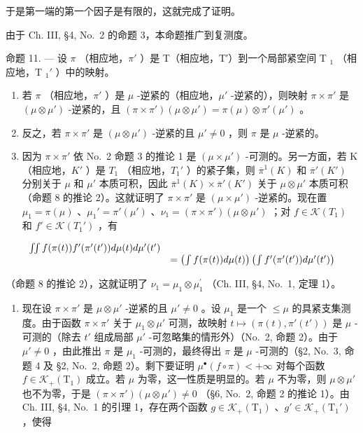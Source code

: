 于是第一端的第一个因子是有限的，这就完成了证明。

由于 Ch. III, §4, No.~2 的命题 3，本命题推广到复测度。

命题 11. --- 设 \(\pi\) （相应地，\(\pi'\) ）是 T（相应地，T′）到一个局部紧空间 T \(_1\) （相应地，T \(_1'\) ）中的映射。

\begin{enumerate}
\def\labelenumi{\alph{enumi})}
\item
  若 \(\pi\) （相应地，\(\pi'\) ）是 \(\mu\) -逆紧的（相应地，\(\mu'\) -逆紧的），则映射 \(\pi \times \pi'\) 是 \((\mu \otimes \mu')\) -逆紧的，且 \((\pi \times \pi')(\mu \otimes \mu') = \pi(\mu) \otimes \pi'(\mu')\) 。
\item
  反之，若 \(\pi \times \pi'\) 是 \((\mu \otimes \mu')\) -逆紧的且 \(\mu' \neq 0\) ，则 \(\pi\) 是 \(\mu\) -逆紧的。
\item
  因为 \(\pi \times \pi'\) 依 No.~2 命题 3 的推论 1 是 \((\mu \times \mu')\) -可测的。另一方面，若 K（相应地，\(K'\) ）是 \(T_1\) （相应地，\(T_1'\) ）的紧子集，则 \(\overline{\pi}^1(K)\) 和 \(\overline{\pi}'(K')\) 分别关于 \(\mu\) 和 \(\mu'\) 本质可积，因此 \(\overline{\pi}^1(K) \times \overline{\pi}'(K')\) 关于 \(\mu \otimes \mu'\) 本质可积（命题 8 的推论 2）。这就证明了 \(\pi \times \pi'\) 是 \((\mu \times \mu')\) -逆紧的。现在置 \(\mu_1 = \pi(\mu)\) 、\(\mu_1' = \pi'(\mu')\) 、\(\nu_1 = (\pi \times \pi')(\mu \otimes \mu')\) ；对 \(f \in \mathcal{K}(T_1)\) 和 \(f' \in \mathcal{K}(T_1')\) ，有
\end{enumerate}

\[
\begin{array}{r l} \iint f (\pi (t)) f ^ {\prime} (\pi^ {\prime} (t ^ {\prime})) d \mu (t) d \mu^ {\prime} (t ^ {\prime}) \\ & = \left(\int f (\pi (t)) d \mu (t)\right) \left(\int f ^ {\prime} (\pi^ {\prime} (t ^ {\prime})) d \mu^ {\prime} (t ^ {\prime})\right) \end{array}
\]

（命题 8 的推论 2），这就证明了 \(\nu_{1} = \mu_{1}\otimes \mu_{1}^{\prime}\) （Ch. III, §4, No.~1, 定理 1）。

\begin{enumerate}
\def\labelenumi{\alph{enumi})}
\setcounter{enumi}{1}
\tightlist
\item
  现在设 \(\pi \times \pi'\) 是 \(\mu \otimes \mu'\) -逆紧的且 \(\mu' \neq 0\) 。设 \(\mu_1\) 是一个 \(\leqslant \mu\) 的具紧支集测度。由于函数 \(\pi \times \pi'\) 关于 \(\mu_1 \otimes \mu'\) 可测，故映射 \(t \mapsto (\pi(t), \pi'(t'))\) 是 \(\mu\) -可测的（除去 \(t'\) 组成局部 \(\mu'\) -可忽略集的情形外）（No.~2, 命题 2）。由于 \(\mu' \neq 0\) ，由此推出 \(\pi\) 是 \(\mu_1\) -可测的，最终得出 \(\pi\) 是 \(\mu\) -可测的（§2, No.~3, 命题 4 及 §2, No.~2, 命题 2）。剩下要证明 \(\mu^{\bullet}(f \circ \pi) < +\infty\) 对每个函数 \(f \in \mathcal{K}_{+}(\mathrm{T}_{1})\) 成立。若 \(\mu\) 为零，这一性质是明显的。若 \(\mu\) 不为零，则 \(\mu \otimes \mu'\) 也不为零，于是 \((\pi \times \pi') (\mu \otimes \mu') \neq 0\) （§6, No.~2, 命题 2 的推论 1）。由 Ch. III, §4, No.~1 的引理 1，存在两个函数 \(g \in \mathcal{K}_{+}(\mathrm{T}_{1})\) 、\(g' \in \mathcal{K}_{+}(\mathrm{T}_{1}')\) ，使得
\end{enumerate}

